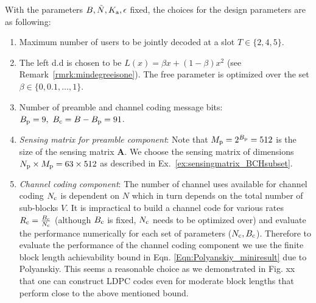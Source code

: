 With the parameters $B,\tilde{N},K_{\text{a}},\epsilon$ fixed, the choices for the design parameters are as following:
\begin{enumerate}
\item Maximum number of users to be jointly decoded at a slot $T\in\{2,4,5\}$.
\item  The left d.d is chosen to be $L(x)=\beta x+(1-\beta)x^2$ (see Remark~\ref{rmrk:mindegreeisone}). The free parameter is optimized over the set $\beta\in\{0,0.1,\ldots,1\}$. 
\item Number of preamble and channel coding message bits: $B_{\mathrm{p}}=9,~B_{\mathrm{c}}=B-B_{\mathrm{p}}=91$. 
\item \textit{Sensing matrix for preamble component}: Note that $M_{\mathrm{p}}=2^{B_{\mathrm{p}}}=512$ is the size of the sensing matrix $\mathbf{A}$. We choose the sensing matrix of dimensions $N_{\mathrm{p}} \times M_{\mathrm{p}}=63\times 512$ as described in Ex.~\ref{ex:sensingmatrix_BCHsubset}.
\item \textit{Channel coding component}: The number of channel uses available for channel coding $N_{\mathrm{c}}$ is dependent on $N$ which in turn depends on the total number of sub-blocks $V$. It is impractical to build a channel code for various rates $R_{\mathrm{c}}=\frac{B_{\mathrm{c}}}{N_{\mathrm{c}}}$ (although $B_{\mathrm{c}}$ is fixed, $N_{\mathrm{c}}$ needs to be optimized over) and evaluate the performance numerically for each set of parameters ($N_{\mathrm{c}},B_{\mathrm{c}}$). Therefore to evaluate the performance of the channel coding component we use the finite block length achievability bound in Eqn. \eqref{Eqn:Polyanskiy_miniresult} due to Polyanskiy. This seems a reasonable choice as we demonstrated in Fig. xx that one can construct LDPC codes even for moderate block lengths that perform close to the above mentioned bound.
\end{enumerate}

